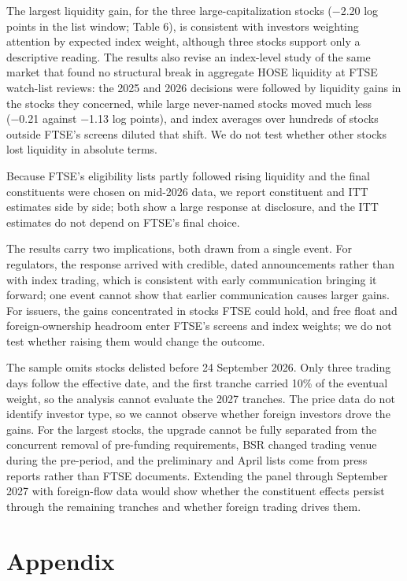 \documentclass[review,authoryear,12pt]{elsarticle}
\begin{document}
The largest liquidity gain, for the three large-capitalization stocks
(−2.20 log points in the list window; Table 6), is consistent with
investors weighting attention by expected index weight, although three
stocks support only a descriptive reading. The results also revise an
index-level study of the same market that found no structural break in
aggregate HOSE liquidity at FTSE watch-list reviews: the 2025 and 2026
decisions were followed by liquidity gains in the stocks they concerned,
while large never-named stocks moved much less (−0.21 against −1.13 log
points), and index averages over hundreds of stocks outside FTSE's
screens diluted that shift. We do not test whether other stocks lost
liquidity in absolute terms.

Because FTSE's eligibility lists partly followed rising liquidity and
the final constituents were chosen on mid-2026 data, we report
constituent and ITT estimates side by side; both show a large response
at disclosure, and the ITT estimates do not depend on FTSE's final
choice.

The results carry two implications, both drawn from a single event. For
regulators, the response arrived with credible, dated announcements
rather than with index trading, which is consistent with early
communication bringing it forward; one event cannot show that earlier
communication causes larger gains. For issuers, the gains concentrated
in stocks FTSE could hold, and free float and foreign-ownership headroom
enter FTSE's screens and index weights; we do not test whether raising
them would change the outcome.

The sample omits stocks delisted before 24 September 2026. Only three
trading days follow the effective date, and the first tranche carried
10\% of the eventual weight, so the analysis cannot evaluate the 2027
tranches. The price data do not identify investor type, so we cannot
observe whether foreign investors drove the gains. For the largest
stocks, the upgrade cannot be fully separated from the concurrent
removal of pre-funding requirements, BSR changed trading venue during
the pre-period, and the preliminary and April lists come from press
reports rather than FTSE documents. Extending the panel through
September 2027 with foreign-flow data would show whether the constituent
effects persist through the remaining tranches and whether foreign
trading drives them.

\hypertarget{appendix}{%
\section*{Appendix}}
\end{document}
